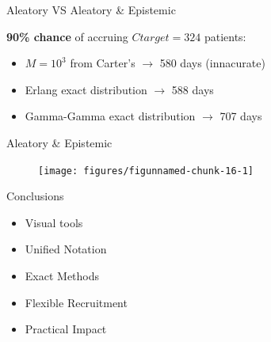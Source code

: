 \documentclass[english]{beamer}\usepackage[]{graphicx}\usepackage[]{xcolor}
\newenvironment{knitrout}{}{} %
\begin{document}
\begin{frame}{Aleatory VS Aleatory \& Epistemic}

\textbf{90\% chance} of accruing $Ctarget=324$ patients: 

\begin{itemize}
\item $M=10^3$ from Carter's $\rightarrow$ 580 days (innacurate)
\item Erlang exact distribution $\rightarrow$ 588 days
\item Gamma-Gamma exact distribution $\rightarrow$ 707 days
\end{itemize}
\end{frame}

\begin{frame}{Aleatory \& Epistemic}
\begin{figure}
\begin{knitrout}
\color{fgcolor}
\texttt{[image: figures/figunnamed-chunk-16-1]} 
\end{knitrout}
\end{figure}

\end{frame}

\begin{frame}{Conclusions}

\begin{itemize}[label = ]
\item Visual tools
\item Unified Notation
\item Exact Methods
\item Flexible Recruitment
\item Practical Impact
\end{itemize}
\end{frame}
\end{document}
